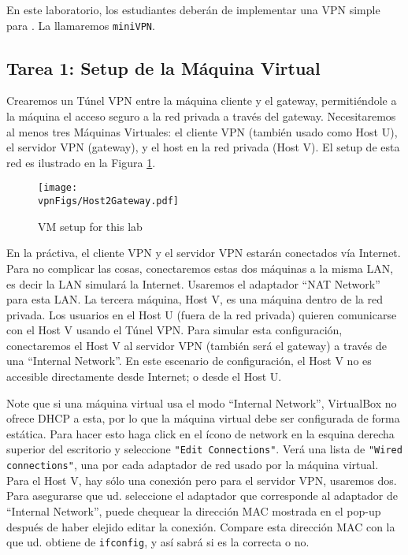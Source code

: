 En este laboratorio, los estudiantes deberán de implementar una VPN simple para \linux. La llamaremos {\tt miniVPN}. 


\subsection{Tarea 1: Setup de la Máquina Virtual}

Crearemos un Túnel VPN entre la máquina cliente y el gateway, permitiéndole a la máquina el acceso seguro a la red privada a través del gateway.
Necesitaremos al menos tres Máquinas Virtuales: el cliente VPN (también usado como Host U), el servidor VPN (gateway), y el host en la red privada (Host V).
El setup de esta red es ilustrado en la Figura \ref{vpn:fig:host2gateway}.

\begin{figure}[htb]
\begin{center}
\texttt{[image: \\vpnFigs/Host2Gateway.pdf]}
\end{center}
\caption{VM setup for this lab}
\label{vpn:fig:host2gateway}
\end{figure}
 

En la práctiva, el cliente VPN y el servidor VPN estarán conectados vía Internet.
Para no complicar las cosas, conectaremos estas dos máquinas a la misma LAN, es decir la LAN simulará la Internet.
Usaremos el adaptador ``NAT Network'' para esta LAN.
La tercera máquina, Host V, es una máquina dentro de la red privada. Los usuarios en el Host U (fuera de la red privada) quieren comunicarse con el Host V usando el Túnel VPN. Para simular esta configuración, conectaremos el Host V al servidor VPN (también será el gateway) a través de una  ``Internal Network''. En este escenario de configuración, el Host V no es accesible directamente desde Internet; o desde el Host U.

Note que si una máquina virtual usa el modo ``Internal Network'', VirtualBox no ofrece DHCP a esta, por lo que la máquina virtual debe ser configurada de forma estática. Para hacer esto haga click en el ícono de network en la esquina derecha superior del escritorio y seleccione \texttt{"Edit Connections"}. Verá una lista de \texttt{"Wired connections"}, una por cada adaptador de red usado por la máquina virtual.
Para el Host V, hay sólo una conexión pero para el servidor VPN, usaremos dos. Para asegurarse que ud. seleccione el adaptador que corresponde al adaptador de ``Internal Network'', puede chequear la dirección MAC mostrada en el pop-up después de haber elejido editar la conexión.
Compare esta dirección MAC con la que ud. obtiene de  \texttt{ifconfig}, y así sabrá si es la correcta o no.

